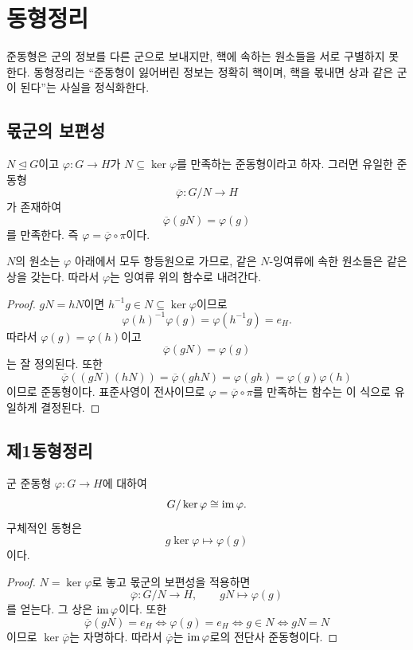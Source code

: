 \section{동형정리}
\label{sec:isomorphism-theorems}

준동형은 군의 정보를 다른 군으로 보내지만, 핵에 속하는 원소들을 서로 구별하지 못한다. 동형정리는 ``준동형이 잃어버린 정보는 정확히 핵이며, 핵을 몫내면 상과 같은 군이 된다''는 사실을 정식화한다.

\subsection{몫군의 보편성}

\begin{theorem}
$N\trianglelefteq G$이고 $\varphi:G\to H$가 $N\subseteq\ker\varphi$를 만족하는 준동형이라고 하자. 그러면 유일한 준동형
\[
  \overline\varphi:G/N\to H
\]
가 존재하여
\[
  \overline\varphi(gN)=\varphi(g)
\]
를 만족한다. 즉 $\varphi=\overline\varphi\circ\pi$이다.
\end{theorem}

\begin{proofidea}
$N$의 원소는 $\varphi$ 아래에서 모두 항등원으로 가므로, 같은 $N$-잉여류에 속한 원소들은 같은 상을 갖는다. 따라서 $\varphi$는 잉여류 위의 함수로 내려간다.
\end{proofidea}

\begin{proof}
$gN=hN$이면 $h^{-1}g\in N\subseteq\ker\varphi$이므로
\[
  \varphi(h)^{-1}\varphi(g)=\varphi(h^{-1}g)=e_H.
\]
따라서 $\varphi(g)=\varphi(h)$이고
\[
  \overline\varphi(gN)=\varphi(g)
\]
는 잘 정의된다. 또한
\[
  \overline\varphi((gN)(hN))
  =\overline\varphi(ghN)
  =\varphi(gh)
  =\varphi(g)\varphi(h)
\]
이므로 준동형이다. 표준사영이 전사이므로 $\varphi=\overline\varphi\circ\pi$를 만족하는 함수는 이 식으로 유일하게 결정된다.
\end{proof}

\subsection{제1동형정리}

\begin{theorem}[제1동형정리]
군 준동형 $\varphi:G\to H$에 대하여
\[
  G/\ker\varphi\cong\operatorname{im}\varphi.
\]
구체적인 동형은
\[
  g\ker\varphi\longmapsto\varphi(g)
\]
이다.
\end{theorem}

\begin{proof}
$N=\ker\varphi$로 놓고 몫군의 보편성을 적용하면
\[
  \overline\varphi:G/N\to H,
  \qquad gN\mapsto\varphi(g)
\]
를 얻는다. 그 상은 $\operatorname{im}\varphi$이다. 또한
\[
  \overline\varphi(gN)=e_H
  \Longleftrightarrow
  \varphi(g)=e_H
  \Longleftrightarrow
  g\in N
  \Longleftrightarrow
  gN=N
\]
이므로 $\ker\overline\varphi$는 자명하다. 따라서 $\overline\varphi$는 $\operatorname{im}\varphi$로의 전단사 준동형이다.
\end{proof}

